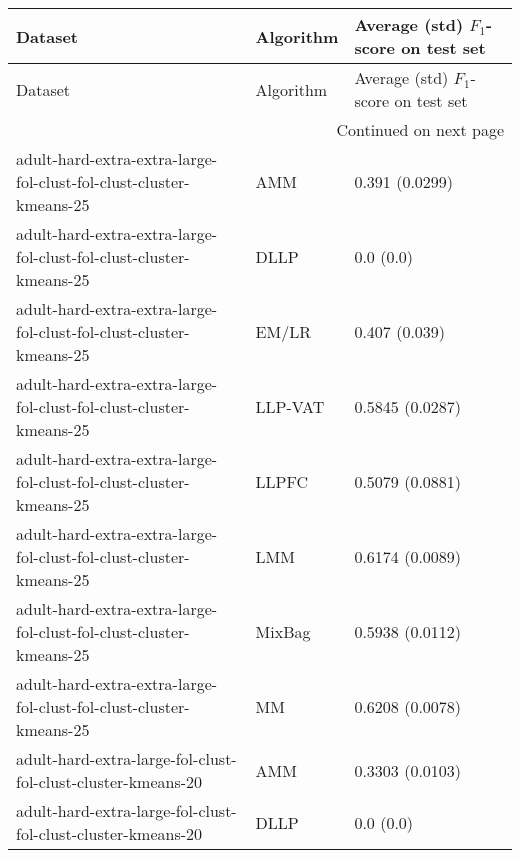 \begin{longtable}{lll}
\toprule
                                                                                                      Dataset & Algorithm & Average (std) $F_1$-score on test set \\
\midrule
\endfirsthead

\toprule
                                                                                                      Dataset & Algorithm & Average (std) $F_1$-score on test set \\
\midrule
\endhead
\midrule
\multicolumn{3}{r}{{Continued on next page}} \\
\midrule
\endfoot

\bottomrule
\endlastfoot
                                           adult-hard-extra-extra-large-fol-clust-fol-clust-cluster-kmeans-25 &       AMM &                        0.391 (0.0299) \\
                                           adult-hard-extra-extra-large-fol-clust-fol-clust-cluster-kmeans-25 &      DLLP &                             0.0 (0.0) \\
                                           adult-hard-extra-extra-large-fol-clust-fol-clust-cluster-kmeans-25 &     EM/LR &                         0.407 (0.039) \\
                                           adult-hard-extra-extra-large-fol-clust-fol-clust-cluster-kmeans-25 &   LLP-VAT &                       0.5845 (0.0287) \\
                                           adult-hard-extra-extra-large-fol-clust-fol-clust-cluster-kmeans-25 &     LLPFC &                       0.5079 (0.0881) \\
                                           adult-hard-extra-extra-large-fol-clust-fol-clust-cluster-kmeans-25 &       LMM &                       0.6174 (0.0089) \\
                                           adult-hard-extra-extra-large-fol-clust-fol-clust-cluster-kmeans-25 &    MixBag &                       0.5938 (0.0112) \\
                                           adult-hard-extra-extra-large-fol-clust-fol-clust-cluster-kmeans-25 &        MM &                       0.6208 (0.0078) \\
                                                 adult-hard-extra-large-fol-clust-fol-clust-cluster-kmeans-20 &       AMM &                       0.3303 (0.0103) \\
                                                 adult-hard-extra-large-fol-clust-fol-clust-cluster-kmeans-20 &      DLLP &                             0.0 (0.0) \\

\end{longtable}
